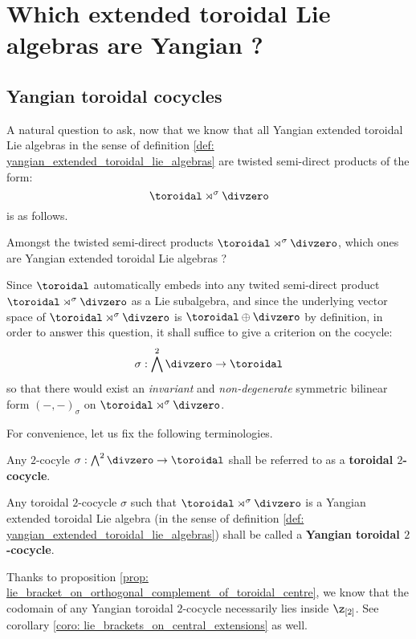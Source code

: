 \section{Which extended toroidal Lie algebras are Yangian ?}
    \subsection{Yangian toroidal cocycles}
        A natural question to ask, now that we know that all Yangian extended toroidal Lie algebras in the sense of definition \ref{def: yangian_extended_toroidal_lie_algebras} are twisted semi-direct products of the form:
            $$\toroidal \rtimes^{\sigma} \divzero$$
        is as follows.
        \begin{question}
            Amongst the twisted semi-direct products $\toroidal \rtimes^{\sigma} \divzero$, which ones are Yangian extended toroidal Lie algebras ? 
        \end{question}
        Since $\toroidal$ automatically embeds into any twited semi-direct product $\toroidal \rtimes^{\sigma} \divzero$ as a Lie subalgebra, and since the underlying vector space of $\toroidal \rtimes^{\sigma} \divzero$ is $\toroidal \oplus \divzero$ by definition, in order to answer this question, it shall suffice to give a criterion on the cocycle:
            $$\sigma: \bigwedge^2 \divzero \to \toroidal$$
        so that there would exist an \textit{invariant} and \textit{non-degenerate} symmetric bilinear form $(-, -)_{\sigma}$ on $\toroidal \rtimes^{\sigma} \divzero$.

        For convenience, let us fix the following terminologies.
        \begin{definition} \label{def: yangian_toroidal_cocycles}
            Any $2$-cocyle $\sigma: \bigwedge^2 \divzero \to \toroidal$ shall be referred to as a \textbf{toroidal $2$-cocycle}.
            
            Any toroidal $2$-cocycle $\sigma$ such that $\toroidal \rtimes^{\sigma} \divzero$ is a Yangian extended toroidal Lie algebra (in the sense of definition \ref{def: yangian_extended_toroidal_lie_algebras}) shall be called a \textbf{Yangian toroidal $2$-cocycle}.
        \end{definition}
        \begin{remark}
            Thanks to proposition \ref{prop: lie_bracket_on_orthogonal_complement_of_toroidal_centre}, we know that the codomain of any Yangian toroidal $2$-cocycle necessarily lies inside $\z_{[2]}$. See corollary \ref{coro: lie_brackets_on_central_extensions} as well.
        \end{remark}

